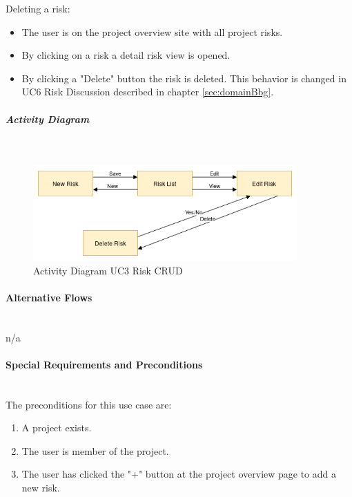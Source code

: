 \noindent
Deleting a risk:
\begin{itemize}
	\vspace{-3mm}
	\setlength\itemsep{-1em}
	\item The user is on the project overview site with all project risks.
	\item By clicking on a risk a detail risk view is opened.
	\item By clicking a "Delete" button the risk is deleted. This behavior is changed in UC6 Risk Discussion described in chapter \ref{sec:domainBbg}.
\end{itemize}

 
\subparagraph{Activity Diagram}\mbox{}\\
\begin{figure}
	\centering
	\includegraphics[width=0.9\textwidth]{Content/Domain/UC3RiskCRUDactivitydiagram.png}
	\caption{Activity Diagram \ac{UC}3 Risk CRUD}
	\label{fig:activityDiagramUC3}
\end{figure}

\paragraph*{Alternative Flows}\mbox{}\\
n/a

\paragraph*{Special Requirements and Preconditions}\mbox{}\\
The preconditions for this use case are:
\begin{enumerate}
	\vspace{-3mm}
	\setlength\itemsep{-1em}
	\item A project exists.
	\item The user is member of the project.
	\item The user has clicked the "+" button at the project overview page to add a new risk.
\end{enumerate}

